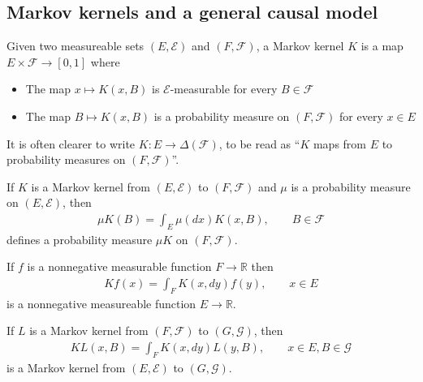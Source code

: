\subsection{Markov kernels and a general causal model}

\begin{definition}
Given two measureable sets $(E,\mathcal{E})$ and $(F,\mathcal{F})$, a Markov kernel $K$ is a map $E\times \mathcal{F} \to [0,1]$ where
\begin{itemize}
    \item The map $x\mapsto K(x,B)$ is $\mathcal{E}$-measurable for every $B\in\mathcal{F}$
    \item The map $B\mapsto K(x,B)$ is a probability measure on $(F,\mathcal{F})$ for every $x\in E$ 
\end{itemize}

It is often clearer to write $K:E\to \Delta(\mathcal{F})$, to be read as ``$K$ maps from $E$ to probability measures on $(F,\mathcal{F})$''.

\end{definition}

\begin{definition}\label{def:kernel_products}
If $K$ is a Markov kernel from $(E,\mathcal{E})$ to $(F,\mathcal{F})$ and $\mu$ is a probability measure on $(E,\mathcal{E})$, then
\begin{align}
    \mu K(B)=\int_E \mu(dx) K(x, B),\qquad B\in\mathcal{F}
\end{align}
defines a probability measure $\mu K$ on $(F,\mathcal{F})$.

If $f$ is a nonnegative measurable function $F\to \mathbb{R}$ then
\begin{align}
    Kf(x) = \int_F K(x,dy)f(y), \qquad x\in E
\end{align}
is a nonnegative measureable function $E\to \mathbb{R}$.

If $L$ is a Markov kernel from $(F,\mathcal{F})$ to $(G,\mathcal{G})$, then
\begin{align}
    KL(x,B) = \int_F K(x,dy) L(y,B),\qquad x\in E, B\in \mathcal{G}
\end{align}
is a Markov kernel from $(E,\mathcal{E})$ to $(G,\mathcal{G})$. \cite{cinlar_probability_2011}
\end{definition}


